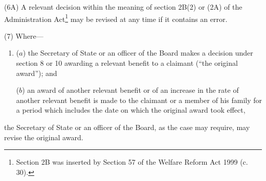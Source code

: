 \documentclass[12pt,a4paper]{article}
\begin{document}
(6A) A relevant decision within the meaning of section 2B(2) 
or (2A)  %
of the Administration Act\footnote{\frenchspacing Section 2B was inserted by Section 57 of the Welfare Reform Act 1999 (c. 30).} may be revised at any time if it contains an error.

%

%

(7) Where—
\begin{enumerate}\item[]
($a$) the Secretary of State or an officer of the Board makes a decision under section 8 or 10 awarding a relevant benefit to a claimant (“the original award”); and

($b$) an award of another relevant benefit or of an increase in the rate of another relevant benefit is made to the claimant or a member of his family for a period which includes the date on which the original award took effect,
\end{enumerate}
the Secretary of State or an officer of the Board, as the case may require, may revise the original award.
\end{document}
